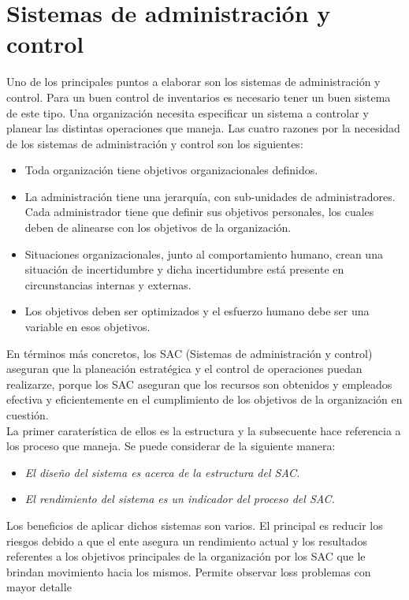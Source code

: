 \documentclass[letterpaper, 12pt]{article}
\begin{document}
    \section{Sistemas de administración y control}
    \justify
    Uno de los principales puntos a elaborar son los sistemas de administración y control. Para un buen control de inventarios es necesario tener un buen sistema de este tipo. Una organización necesita especificar un sistema a controlar y planear las distintas operaciones
    que maneja. Las cuatro razones por la necesidad de los sistemas de administración y control son los siguientes:
    \begin{itemize}
        \item Toda organización tiene objetivos organizacionales definidos.
        \item La administración tiene una jerarquía, con sub-unidades de administradores. Cada administrador tiene que definir sus objetivos personales, los cuales deben de alinearse con los objetivos de la organización.
        \item Situaciones organizacionales, junto al comportamiento humano, crean una situación de incertidumbre y dicha incertidumbre está presente en circunstancias internas y externas.
        \item Los objetivos deben ser optimizados y el esfuerzo humano debe ser una variable en esos objetivos.
    \end{itemize}
    En términos más concretos, los SAC (Sistemas de administración y control) aseguran que la planeación estratégica y el control de operaciones puedan realizarze, porque los SAC aseguran que los recursos son obtenidos y empleados efectiva y eficientemente en el cumplimiento de los objetivos
    de la organización en cuestión.
    \\\newline
    La primer caraterística de ellos es la estructura y la subsecuente hace referencia a los proceso que maneja. Se puede considerar de la siguiente manera:
    \begin{itemize}
        \item \emph{El diseño del sistema es acerca de la estructura del SAC.}
        \item \emph{El rendimiento del sistema es un indicador del proceso del SAC.}
    \end{itemize}
    Los beneficios de aplicar dichos sistemas son varios. El principal es reducir los riesgos debido a que el ente asegura un rendimiento actual y los resultados referentes a los objetivos principales de la organización por los SAC que le brindan movimiento hacia los mismos. Permite observar loss problemas con mayor detalle
\end{document}
